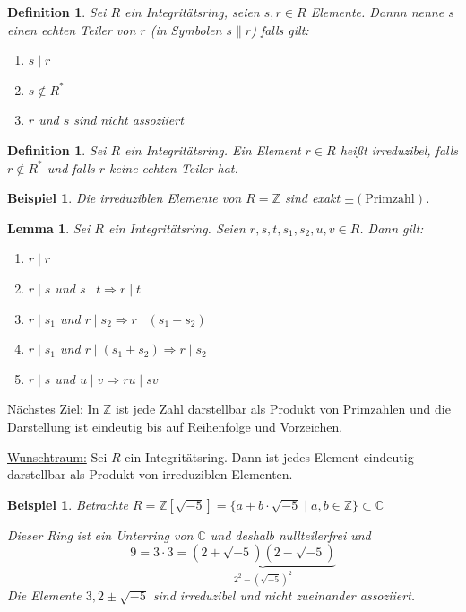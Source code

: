 \documentclass[a4paper,12pt,numbers=noenddot,parskip=full]{scrartcl}
\newcommand{\setZ}{\mathbb{Z}}
\newcommand{\setC}{\mathbb{C}}
\newcommand{\heading}{\underline}
\theoremstyle{dotless}
\newtheorem{lemma}[theorem]{Lemma}
\newtheorem{definition}[theorem]{Definition}
\newtheorem{example}[theorem]{Beispiel}
\theoremstyle{remark}
\begin{document}
 	\begin{definition}
 		Sei $R$ ein Integritätsring, seien $s,r \in R$ Elemente. Dannn nenne $s$ einen echten Teiler von $r$ (in Symbolen $s \parallel r$) falls gilt:
 		\begin{enumerate}
 			\item $s \mid r$
 			\item $s \notin R^*$
 			\item $r$ und $s$ sind nicht assoziiert
 		\end{enumerate}
 	\end{definition}
 
 	\begin{definition}
 		Sei $R$ ein Integritätsring. Ein Element $r \in R$ heißt irreduzibel, falls $r \notin R^*$ und falls $r$ keine echten Teiler hat.
 	\end{definition}
 
 	\begin{example}
 		Die irreduziblen Elemente von $R = \setZ$ sind exakt $\pm(\text{Primzahl})$.
 	\end{example}
 
 	\begin{lemma}
 		Sei $R$ ein Integritätsring. Seien $r, s, t, s_1, s_2, u, v \in R$. Dann gilt:
 		\begin{enumerate}
 			\item $r \mid r$
 			\item $r \mid s$ und $s \mid t \Rightarrow r \mid t$
 			\item $r \mid s_1$ und $r \mid s_2 \Rightarrow r \mid (s_1 + s_2)$
 			\item $r \mid s_1$ und $r \mid (s_1 + s_2) \Rightarrow r \mid s_2$
 			\item $r \mid s$ und $u \mid v \Rightarrow ru \mid sv$
 		\end{enumerate}
 	\end{lemma}
 
 	\heading{Nächstes Ziel:} In $\setZ$ ist jede Zahl darstellbar als Produkt von Primzahlen und die Darstellung ist eindeutig bis auf Reihenfolge und Vorzeichen.
 	
 	\heading{Wunschtraum:} Sei $R$ ein Integritätsring. Dann ist jedes Element eindeutig darstellbar als Produkt von irreduziblen Elementen.
 	
 	\begin{example}
 		Betrachte $R = \setZ[\sqrt{-5}] = \{ a + b \cdot \sqrt{-5} \mid a,b \in \setZ \} \subset \setC$
 		
 		Dieser Ring ist ein Unterring von $\setC$ und deshalb nullteilerfrei und
 		\begin{equation*}
 			9 = 3 \cdot 3 = \underbrace{(2 + \sqrt{-5})(2 - \sqrt{-5})}_{2^2 - (\sqrt{-5})^2}
 		\end{equation*}
 		Die Elemente $3, 2 \pm \sqrt{-5}$ sind irreduzibel und nicht zueinander assoziiert.
 	\end{example}
 
\end{document}
